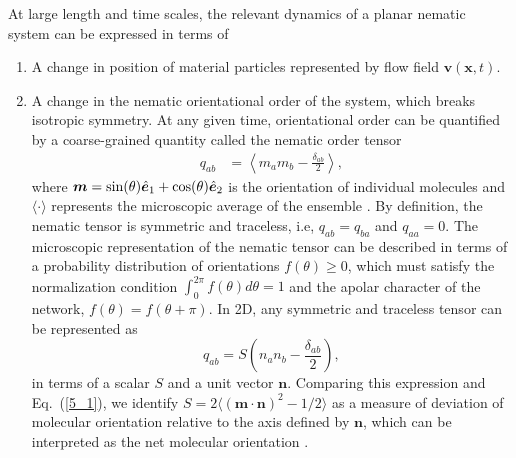 At large length and time scales, the relevant dynamics of a planar nematic system can be expressed in terms of
\begin{enumerate}
	\item A change in position of material particles represented by flow field $\bm{v}(\bm{x},t)$.
	\item A change in the nematic orientational order of the system, which breaks  isotropic symmetry. At any given time, orientational order can be quantified by a coarse-grained quantity called the nematic order tensor
	\begin{align} \label{5_1}
		q_{ab}  & =  \left\langle m_a m_b - \frac{\delta_{ab}}{2}\right\rangle,
	\end{align}
	where $\bm{m} = \textup{sin}(\theta) \hat{\bm{e}}_1 + \textup{cos}(\theta) \hat{\bm{e}}_2 $ is the orientation of individual molecules and $\langle \cdot  \rangle$ represents the microscopic average of the ensemble \cite{mottram2014}. By definition, the nematic tensor is symmetric and traceless, i.e, $q_{ab}=q_{ba}$  and $q_{aa}=0$. The microscopic representation of the nematic tensor can be described in terms of a probability distribution of orientations $f(\theta)\geq 0$, which must satisfy the normalization condition  $ \int_0^{2\pi} f(\theta)d\theta=1$ and the apolar character of the network, $f(\theta) =f(\theta+\pi)$. In 2D, any symmetric and traceless tensor can be represented as
	\begin{equation}
		q_{ab} = S\left(n_a n_b -\frac{\delta_{ab}}{2}\right),
	\end{equation}
in terms of a scalar $S$ and a unit vector $\bm{n}$. Comparing this expression and Eq.~(\ref{5_1}), we identify $S= 2 \langle (\bm{m} \cdot \bm{n})^2 -1/2 \rangle$ as a measure of deviation of molecular orientation relative to the axis defined by $\bm{n}$, which can be interpreted as the net molecular orientation \cite{selinger2016}.
\end{enumerate}
